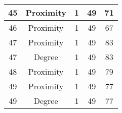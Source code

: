 \documentclass[results.tex]{subfiles}
\begin{document}
\begin{center}
\begin{tabular}{| c || c | c | c | c |}
            \hline
            45                      & Proximity                    & 1                      & 49                      & 71                   \\
            \hline
            46                      & Proximity                    & 1                      & 49                      & 67                   \\
            \hline
            47                      & Proximity                    & 1                      & 49                      & 83                   \\
            \hline
            47                      & Degree                       & 1                      & 49                      & 83                   \\
            \hline
            48                      & Proximity                    & 1                      & 49                      & 79                   \\
            \hline
            49                      & Proximity                    & 1                      & 49                      & 77                   \\
            \hline
            49                      & Degree                       & 1                      & 49                      & 77                   \\
            \hline
        \end{tabular}
    \end{center}
\end{document}
